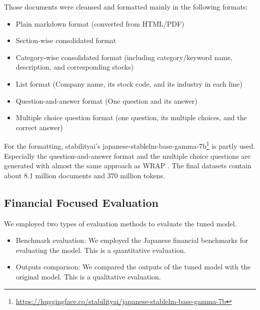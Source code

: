 Those documents were cleansed and formatted mainly in the following formats:
\begin{itemize}
    \item Plain markdown format (converted from HTML/PDF)
    \item Section-wise consolidated format
    \item Category-wise consolidated format (including category/keyword name, description, and corresponding stocks)
    \item List format (Company name, its stock code, and its industry in each line)
    \item Question-and-answer format (One question and its answer)
    \item Multiple choice question format (one question, its multiple choices, and the correct answer)
\end{itemize}
For the formatting, stabilityai's japanese-stablelm-base-gamma-7b\footnote{\url{https://huggingface.co/stabilityai/japanese-stablelm-base-gamma-7b}} is partly used.
Especially the question-and-answer format and the multiple choice questions are generated with almost the same approach as WRAP \cite{maini2024rephrasing}.
The final datasets contain about 8.1 million documents and 370 million tokens.

\subsection{Financial Focused Evaluation}
We employed two types of evaluation methods to evaluate the tuned model.
\begin{itemize}
    \item Benchmark evaluation: We employed the Japanese financial benchmarks \cite{Hirano2023-finnlpkdf} for evaluating the model. This is a quantitative evaluation.
    \item Outputs comparison: We compared the outputs of the tuned model with the original model. This is a qualitative evaluation.
\end{itemize}

